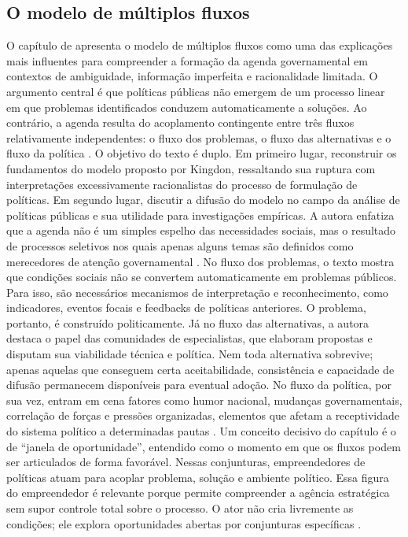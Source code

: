 \documentclass[12pt,a4paper]{article}
\begin{document}
\subsection{O modelo de múltiplos fluxos}
\label{sec:orgb2fa5d7}
O capítulo de \textcite{capella2022multiplos} apresenta o modelo de múltiplos fluxos como uma das explicações mais influentes para compreender a formação da agenda governamental em contextos de ambiguidade, informação imperfeita e racionalidade limitada. O argumento central é que políticas públicas não emergem de um processo linear em que problemas identificados conduzem automaticamente a soluções. Ao contrário, a agenda resulta do acoplamento contingente entre três fluxos relativamente independentes: o fluxo dos problemas, o fluxo das alternativas e o fluxo da política \autocites{capella2022multiplos}{kingdon2003agendas}.
O objetivo do texto é duplo. Em primeiro lugar, reconstruir os fundamentos do modelo proposto por Kingdon, ressaltando sua ruptura com interpretações excessivamente racionalistas do processo de formulação de políticas. Em segundo lugar, discutir a difusão do modelo no campo da análise de políticas públicas e sua utilidade para investigações empíricas. A autora enfatiza que a agenda não é um simples espelho das necessidades sociais, mas o resultado de processos seletivos nos quais apenas alguns temas são definidos como merecedores de atenção governamental \autocite{capella2022multiplos}.
No fluxo dos problemas, o texto mostra que condições sociais não se convertem automaticamente em problemas públicos. Para isso, são necessários mecanismos de interpretação e reconhecimento, como indicadores, eventos focais e feedbacks de políticas anteriores. O problema, portanto, é construído politicamente. Já no fluxo das alternativas, a autora destaca o papel das comunidades de especialistas, que elaboram propostas e disputam sua viabilidade técnica e política. Nem toda alternativa sobrevive; apenas aquelas que conseguem certa aceitabilidade, consistência e capacidade de difusão permanecem disponíveis para eventual adoção. No fluxo da política, por sua vez, entram em cena fatores como humor nacional, mudanças governamentais, correlação de forças e pressões organizadas, elementos que afetam a receptividade do sistema político a determinadas pautas \autocite{capella2022multiplos}.
Um conceito decisivo do capítulo é o de “janela de oportunidade”, entendido como o momento em que os fluxos podem ser articulados de forma favorável. Nessas conjunturas, empreendedores de políticas atuam para acoplar problema, solução e ambiente político. Essa figura do empreendedor é relevante porque permite compreender a agência estratégica sem supor controle total sobre o processo. O ator não cria livremente as condições; ele explora oportunidades abertas por conjunturas específicas \autocites{capella2022multiplos}{kingdon2003agendas}.
\end{document}

